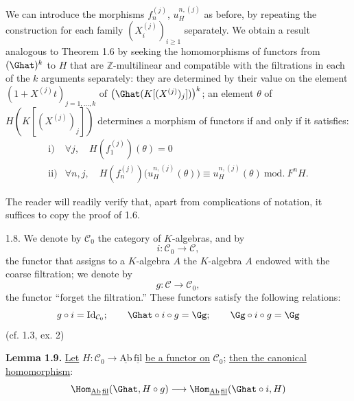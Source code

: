 We can introduce the morphisms \(f_n^{(j)}\), \(u_H^{n,(j)}\) as before, by repeating the construction for each family \((X_i^{(j)})_{i\geq 1}\) separately. We obtain a result analogous to Theorem 1.6 by seeking the homomorphisms of functors from \((\Ghat)^k\) to \(H\) that are \(\mathbb Z\)-multilinear and compatible with the filtrations in each of the \(k\) arguments separately: they are determined by their value on the element
%
\((1+X^{(j)}t)_{j=1,\ldots,k}\) of \(\bigl(\Ghat(K[(X^{(j)})_j])\bigr)^k\); an element \(\theta\) of \(H(K[(X^{(j)})_j])\) determines a morphism of functors if and only if it satisfies:
\[
\begin{array}{ll}
\text{i)}& \forall j,\quad H(f_1^{(j)})(\theta)=0\\[0.3em]
\text{ii)}& \forall n,j,\quad
H(f_n^{(j)})\bigl(u_H^{n,(j)}(\theta)\bigr)
\equiv u_H^{n,(j)}(\theta)\ \mathrm{mod.}\ F^nH.
\end{array}
\]

The reader will readily verify that, apart from complications of notation, it suffices to copy the proof of 1.6.

1.8. We denote by \(\mathcal C_0\) the category of \(K\)-algebras, and by
\[
  i:\mathcal C_0\longrightarrow \mathcal C,
\]
the functor that assigns to a \(K\)-algebra \(A\) the \(K\)-algebra \(A\) endowed with the coarse filtration; we denote by
\[
  g:\mathcal C\longrightarrow\mathcal C_0,
\]
the functor ``forget the filtration.'' These functors satisfy the following relations:
\[
  g\circ i=\operatorname{Id}_{\mathcal C_0};\qquad
  \Ghat\circ i\circ g=\Gg;\qquad
  \Gg\circ i\circ g=\Gg
\]
(cf. 1.3, ex. 2)

\textbf{Lemma 1.9.} \uline{Let} \(H:\mathcal C_0\to\underline{\mathrm{Ab}}\,\underline{\mathrm{fil}}\) \uline{be a functor on} \(\mathcal C_0\); \uline{then the canonical homomorphism}:
\[
  \Hom_{\underline{\mathrm{Ab}}\,\underline{\mathrm{fil}}}(\Ghat,H\circ g)
  \longrightarrow
  \Hom_{\underline{\mathrm{Ab}}\,\underline{\mathrm{fil}}}(\Ghat\circ i,H)
\]
